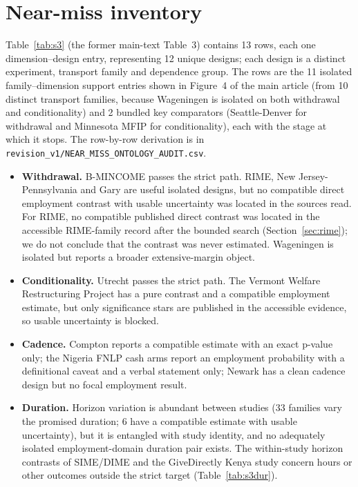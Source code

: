 \documentclass[11pt]{article}
\begin{document}
\begin{landscape}

\end{landscape}

\section{Near-miss inventory}

Table~\ref{tab:s3} (the former main-text Table~3) contains 13 rows, each one dimension--design entry, representing 12 unique designs; each design is a distinct experiment, transport family and dependence group. The rows are the 11 isolated family--dimension support entries shown in Figure~4 of the main article (from 10 distinct transport families, because Wageningen is isolated on both withdrawal and conditionality) and 2 bundled key comparators (Seattle-Denver for withdrawal and Minnesota MFIP for conditionality), each with the stage at which it stops. The row-by-row derivation is in \texttt{revision\_v1/NEAR\_MISS\_ONTOLOGY\_AUDIT.csv}. %
\begin{itemize}
\item \textbf{Withdrawal.} B-MINCOME passes the strict path. RIME, New Jersey-Pennsylvania and Gary are useful isolated designs, but no compatible direct employment contrast with usable uncertainty was located in the sources read. For RIME, no compatible published direct contrast was located in the accessible RIME-family record after the bounded search (Section~\ref{sec:rime}); we do not conclude that the contrast was never estimated. Wageningen is isolated but reports a broader extensive-margin object.
\item \textbf{Conditionality.} Utrecht passes the strict path. The Vermont Welfare Restructuring Project has a pure contrast and a compatible employment estimate, but only significance stars are published in the accessible evidence, so usable uncertainty is blocked.
\item \textbf{Cadence.} Compton reports a compatible estimate with an exact p-value only; the Nigeria FNLP cash arms report an employment probability with a definitional caveat and a verbal statement only; Newark has a clean cadence design but no focal employment result.
\item \textbf{Duration.} Horizon variation is abundant between studies (33 families vary the promised duration; 6 have a compatible estimate with usable uncertainty), but it is entangled with study identity, and no adequately isolated employment-domain duration pair exists. The within-study horizon contrasts of SIME/DIME and the GiveDirectly Kenya study concern hours or other outcomes outside the strict target (Table~\ref{tab:s3dur}). %
\end{itemize}
\end{document}
